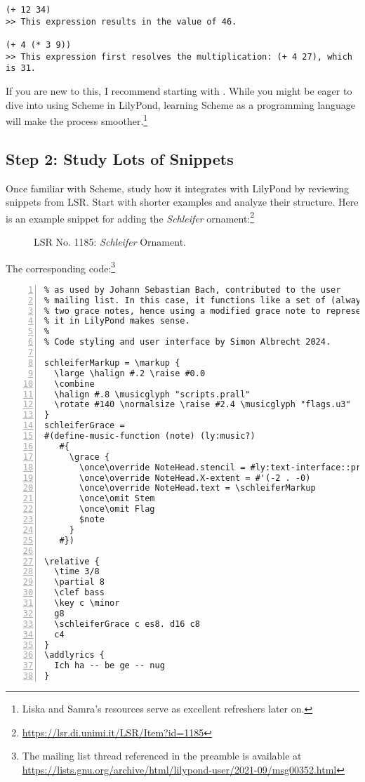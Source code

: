 \begin{Verbatim}
(+ 12 34)    
>> This expression results in the value of 46.

(+ 4 (* 3 9))
>> This expression first resolves the multiplication: (+ 4 27), which is 31.
\end{Verbatim}

If you are new to this, I recommend starting with \cite{LS0001}. While you might be eager to dive into using Scheme in LilyPond, learning Scheme as a programming language will make the process smoother.\footnote{Liska and Samra’s resources serve as excellent refreshers later on.}

\subsection{Step 2: Study Lots of Snippets}
Once familiar with Scheme, study how it integrates with LilyPond by reviewing snippets from LSR. Start with shorter examples and analyze their structure. Here is an example snippet for adding the \textit{Schleifer} ornament:\footnote{\url{https://lsr.di.unimi.it/LSR/Item?id=1185}}
	\begin{figure}[!htb]
	\centering
	\caption{\label{fig:figure1} LSR No. 1185: \textit{Schleifer} Ornament.}
	\end{figure}
The corresponding code:\footnote{The mailing list thread referenced in the preamble is available at \url{https://lists.gnu.org/archive/html/lilypond-user/2021-09/msg00352.html}}
\begin{Verbatim}[numbers=left,xleftmargin=5mm]
% Implementation by Martin Straeten of the Schleifer ornament 
% as used by Johann Sebastian Bach, contributed to the user 
% mailing list. In this case, it functions like a set of (always?)
% two grace notes, hence using a modified grace note to represent 
% it in LilyPond makes sense.
%
% Code styling and user interface by Simon Albrecht 2024.

schleiferMarkup = \markup {
  \large \halign #.2 \raise #0.0
  \combine
  \halign #.8 \musicglyph "scripts.prall"
  \rotate #140 \normalsize \raise #2.4 \musicglyph "flags.u3"
}
schleiferGrace =
#(define-music-function (note) (ly:music?)
   #{
     \grace {
       \once\override NoteHead.stencil = #ly:text-interface::print
       \once\override NoteHead.X-extent = #'(-2 . -0)
       \once\override NoteHead.text = \schleiferMarkup
       \once\omit Stem
       \once\omit Flag
       $note
     }
   #})

\relative {
  \time 3/8
  \partial 8
  \clef bass
  \key c \minor
  g8
  \schleiferGrace c es8. d16 c8
  c4
}
\addlyrics {
  Ich ha -- be ge -- nug
}
\end{Verbatim}

